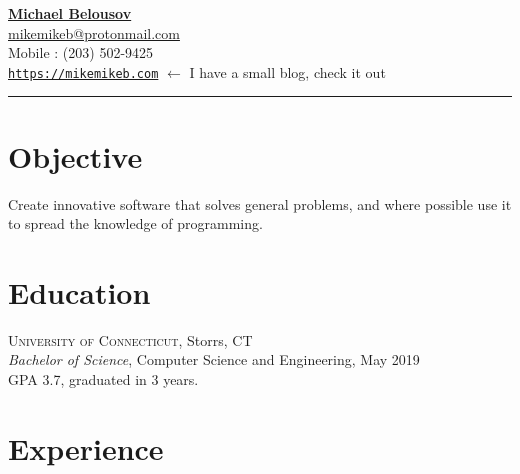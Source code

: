 \documentclass[Letterpaper,11pt]{article}
\begin{document}
\setlength{\parindent}{0em}
\setlength{\parskip}{1em}
\setlength{\parsep}{1em}
\setlength{\itemsep}{0.2em}
\setlength{\headsep}{0.2em}
\setlength{\topskip}{0.2em}
\setlength{\topmargin}{0.2em}
\setlength{\topsep}{0.2em}
\setlength{\partopsep}{0.2em}
\setlength{\columnsep}{1em}

\addtolength{\topmargin}{-4em}

\textbf{\href{mailto:michael.belousov98@gmail.com}{\Large Michael Belousov}}\\
\href{mailto:mikemikeb@protonmail.com}{mikemikeb@protonmail.com}\\
Mobile : (203) 502-9425\\
\href{https://mikemikeb.com}{\texttt{https://mikemikeb.com}} $\gets$ I have a small blog, check it out\\
\hrule
\vspace{1em} %


\vspace{0.3em}


\section*{Objective}

    Create innovative software that solves general problems, and where
    possible use it to spread the knowledge of programming.

\section*{Education}

    \textsc{University of Connecticut}, Storrs, CT\\
    \textit{Bachelor of Science}, Computer Science and Engineering, May 2019\\
    GPA 3.7, graduated in 3 years.
        

\section*{Experience}
\end{document}
